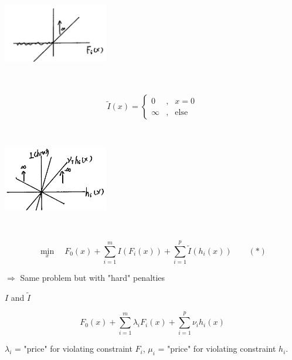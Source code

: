 \begin{marginfigure}
\centering
\includegraphics[width=1.8in,height=1.8in]{figures/ch10/figure1127_2.png}
\end{marginfigure}

\begin{equation}
\label{eq6}
\tilde{I}(x)=\left\{
\begin{aligned}
0 & , & x= 0 \\
\infty & , & \text{else}
\end{aligned}
\right.
\end{equation}


\begin{marginfigure}
\centering
\includegraphics[width=1.8in,height=1.8in]{figures/ch10/figure1127_3.png}
\end{marginfigure}


\begin{equation*}
\min_x\quad F_0(x) + \sum^m_{i=1}I(F_i(x)) + \sum^p_{i=1}\tilde{I}(h_i(x)) \qquad (*)
\end{equation*}

$\Rightarrow$ Same problem but with "hard" penalties

$I$ and $\tilde{I}$

\begin{equation*}
F_0(x) + \sum^m_{i=1}\lambda_i F_i(x) + \sum^p_{i=1}\nu_i h_i(x)
\end{equation*}

$\lambda_i$ = "price" for violating constraint $F_i$, $\mu_i$ = "price" for violating constraint $h_i$.

